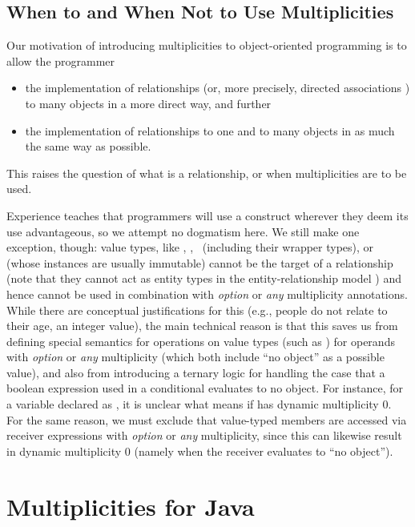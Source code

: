 {\subsection{When to and When Not to Use Multiplicities}
\label{section3.6}

Our motivation of introducing multiplicities to object-oriented programming
is to allow the programmer

\begin{itemize}
  \item the implementation of relationships (or, more precisely, directed
    associations \cite{ref28}) to many objects in a more direct way, and further
  \item the implementation of relationships to one and to many objects in as
    much the same way as possible.
\end{itemize}

\noindent This raises the question of what is a relationship, or when
multiplicities are to be used.

Experience teaches that programmers will use a construct wherever they
deem its use advantageous, so we attempt no dogmatism here. We still make
one exception, though: value types, like , ,
~(including their wrapper types), or  (whose
instances are usually immutable) cannot be the target of a relationship
(note that they cannot act as entity types in the entity-relationship model
\cite{ref8}) and hence cannot be used in combination with \emph{option} or
\emph{any} multiplicity annotations. While there are conceptual
justifications for this (e.g., people do not relate to their age, an integer
value), the main technical reason is that this saves us from defining
special semantics for operations on value types (such as \inline{+}) for operands
with \emph{option} or \emph{any} multiplicity (which both include
``no object'' as a possible value), and also from introducing a ternary logic
for handling the case that a boolean expression used in a conditional
evaluates to no object. For instance, for a variable declared as
, it is unclear what  means
if  has dynamic multiplicity 0. For the same reason, we must
exclude that value-typed members are accessed via receiver expressions with
\emph{option} or \emph{any} multiplicity, since this can likewise
result in dynamic multiplicity 0 (namely when the receiver evaluates to
``no object'').

\section{Multiplicities for Java}
\label{section4}

}
